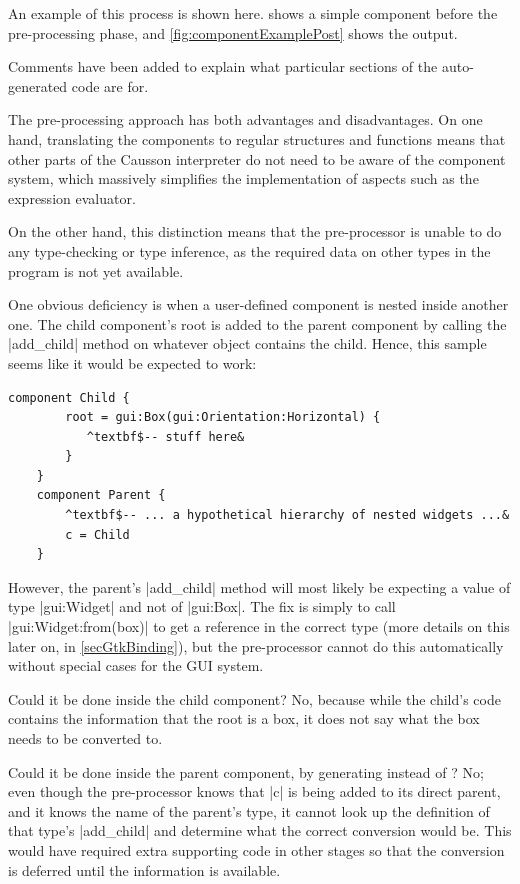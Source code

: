 \documentclass[11pt]{report}
\begin{document}
An example of this process is shown here.  shows a simple component before the pre-processing phase, and \cref{fig:componentExamplePost} shows the output.

Comments have been added to explain what particular sections of the auto-generated code are for.

The pre-processing approach has both advantages and disadvantages. On one hand, translating the components to regular structures and functions means that other parts of the Causson interpreter do not need to be aware of the component system, which massively simplifies the implementation of aspects such as the expression evaluator.

On the other hand, this distinction means that the pre-processor is unable to do any type-checking or type inference, as the required data on other types in the program is not yet available.

One obvious deficiency is when a user-defined component is nested inside another one. The child component's root is added to the parent component by calling the |add_child| method on whatever object contains the child. Hence, this sample seems like it would be expected to work:

\begin{Verbatim}[commandchars=^$&]
    component Child {
        root = gui:Box(gui:Orientation:Horizontal) {
           ^textbf$-- stuff here&
        }
    }
    component Parent {
        ^textbf$-- ... a hypothetical hierarchy of nested widgets ...&
        c = Child
    }
\end{Verbatim}

However, the parent's |add_child| method will most likely be expecting a value of type |gui:Widget| and not of |gui:Box|. The fix is simply to call |gui:Widget:from(box)| to get a reference in the correct type (more details on this later on, in \cref{secGtkBinding}), but the pre-processor cannot do this automatically without special cases for the GUI system.

Could it be done inside the child component? No, because while the child's code contains the information that the root is a box, it does not say what the box needs to be converted to.

Could it be done inside the parent component, by generating  instead of ? No; even though the pre-processor knows that |c| is being added to its direct parent, and it knows the name of the parent's type, it cannot look up the definition of that type's |add_child| and determine what the correct conversion would be. This would have required extra supporting code in other stages so that the conversion is deferred until the information is available.
\end{document}
